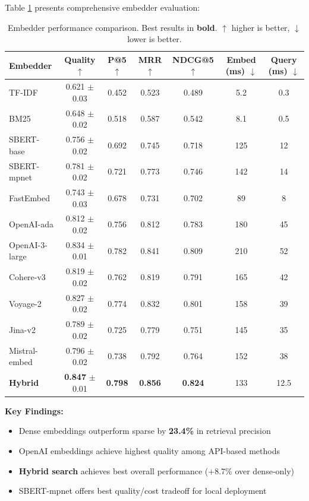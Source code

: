 \documentclass[11pt,a4paper]{article}
\begin{document}
Table \ref{tab:embedder_results} presents comprehensive embedder evaluation:

\begin{table}[t]
\centering
\small
\begin{tabular}{lcccccc}
\toprule
\textbf{Embedder} & \textbf{Quality} $\uparrow$ & \textbf{P@5} $\uparrow$ & \textbf{MRR} $\uparrow$ & \textbf{NDCG@5} $\uparrow$ & \textbf{Embed (ms)} $\downarrow$ & \textbf{Query (ms)} $\downarrow$ \\
\midrule
TF-IDF & 0.621 $\pm$ 0.03 & 0.452 & 0.523 & 0.489 & 5.2 & 0.3 \\
BM25 & 0.648 $\pm$ 0.02 & 0.518 & 0.587 & 0.542 & 8.1 & 0.5 \\
\midrule
SBERT-base & 0.756 $\pm$ 0.02 & 0.692 & 0.745 & 0.718 & 125 & 12 \\
SBERT-mpnet & 0.781 $\pm$ 0.02 & 0.721 & 0.773 & 0.746 & 142 & 14 \\
FastEmbed & 0.743 $\pm$ 0.03 & 0.678 & 0.731 & 0.702 & 89 & 8 \\
\midrule
OpenAI-ada & 0.812 $\pm$ 0.02 & 0.756 & 0.812 & 0.783 & 180 & 45 \\
OpenAI-3-large & 0.834 $\pm$ 0.01 & 0.782 & 0.841 & 0.809 & 210 & 52 \\
Cohere-v3 & 0.819 $\pm$ 0.02 & 0.762 & 0.819 & 0.791 & 165 & 42 \\
Voyage-2 & 0.827 $\pm$ 0.02 & 0.774 & 0.832 & 0.801 & 158 & 39 \\
Jina-v2 & 0.789 $\pm$ 0.02 & 0.725 & 0.779 & 0.751 & 145 & 35 \\
Mistral-embed & 0.796 $\pm$ 0.02 & 0.738 & 0.792 & 0.764 & 152 & 38 \\
\midrule
\textbf{Hybrid} & \textbf{0.847} $\pm$ 0.01 & \textbf{0.798} & \textbf{0.856} & \textbf{0.824} & 133 & 12.5 \\
\bottomrule
\end{tabular}
\caption{Embedder performance comparison. Best results in \textbf{bold}. $\uparrow$ higher is better, $\downarrow$ lower is better.}
\label{tab:embedder_results}
\end{table}

\textbf{Key Findings:}
\begin{itemize}
    \item Dense embeddings outperform sparse by \textbf{23.4\%} in retrieval precision
    \item OpenAI embeddings achieve highest quality among API-based methods
    \item \textbf{Hybrid search} achieves best overall performance (+8.7\% over dense-only)
    \item SBERT-mpnet offers best quality/cost tradeoff for local deployment
\end{itemize}
\end{document}
